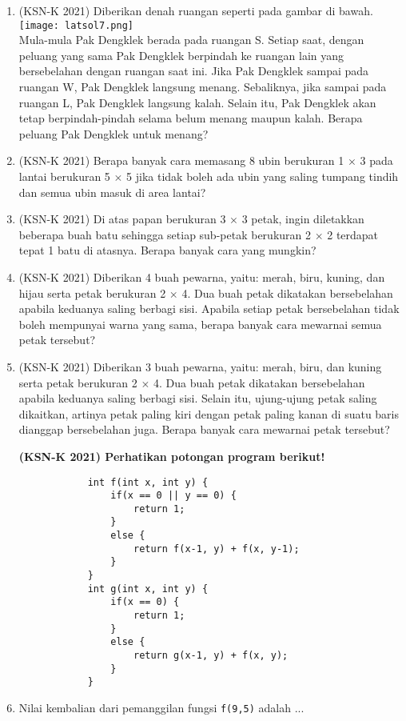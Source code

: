 \begin{enumerate}
	 	    \item (KSN-K 2021) Diberikan denah ruangan seperti pada gambar di bawah.\\
	 	     	    	\texttt{[image: latsol7.png]}\\
	 	     	    Mula-mula Pak Dengklek berada pada ruangan S. Setiap saat, dengan peluang yang 
	 	     	    sama Pak Dengklek berpindah ke ruangan lain yang bersebelahan dengan ruangan saat 
	 	     	    ini. Jika Pak Dengklek sampai pada ruangan W, Pak Dengklek langsung menang. 
	 	     	    Sebaliknya, jika sampai pada ruangan L, Pak Dengklek langsung kalah. Selain itu, Pak 
	 	     	    Dengklek akan tetap berpindah-pindah selama belum menang maupun kalah. Berapa 
	 	     	    peluang Pak Dengklek untuk menang?
	 	     	    
	 	    \item (KSN-K 2021)  Berapa banyak cara memasang 8 ubin berukuran 1 $\times$ 3 pada lantai berukuran 5 $\times$ 5 jika 
	 	    tidak boleh ada ubin yang saling tumpang tindih dan semua ubin masuk di area lantai?
	 	    
	 	    \item (KSN-K 2021)  Di atas papan berukuran 3 $\times$ 3 petak, ingin diletakkan beberapa buah batu sehingga setiap 
	 	    sub-petak berukuran 2 $\times$ 2 terdapat tepat 1 batu di atasnya. Berapa banyak cara yang 
	 	    mungkin?
	 	    
	 	    \item (KSN-K 2021) Diberikan 4 buah pewarna, yaitu: merah, biru, kuning, dan hijau serta petak berukuran 2 
	 	    $\times$ 4. Dua buah petak dikatakan bersebelahan apabila keduanya saling berbagi sisi. Apabila 
	 	    setiap petak bersebelahan tidak boleh mempunyai warna yang sama, berapa banyak cara 
	 	    mewarnai semua petak tersebut?
	 	    
		    \item (KSN-K 2021) Diberikan 3 buah pewarna, yaitu: merah, biru, dan kuning serta petak berukuran 2 $\times$ 4.
		    Dua buah petak dikatakan bersebelahan apabila keduanya saling berbagi sisi. Selain itu, 
		    ujung-ujung petak saling dikaitkan, artinya petak paling kiri dengan petak paling kanan di 
		    suatu baris dianggap bersebelahan juga. Berapa banyak cara mewarnai petak tersebut?
		    
		    \textbf{(KSN-K 2021) Perhatikan potongan program berikut!}
		    \begin{lstlisting}
		    int f(int x, int y) {
		    	if(x == 0 || y == 0) {
		    		return 1;
		    	}
		    	else {
		    		return f(x-1, y) + f(x, y-1);
		    	}
		    }
		    int g(int x, int y) {
	   	    	if(x == 0) {
	   	    		return 1;
	   	    	}
	   	    	else {
	   	    		return g(x-1, y) + f(x, y);
	   	    	}
	 	    }
		    \end{lstlisting}
		    \item  Nilai kembalian dari pemanggilan fungsi \verb*|f(9,5)| adalah ...
		    

\end{enumerate}
